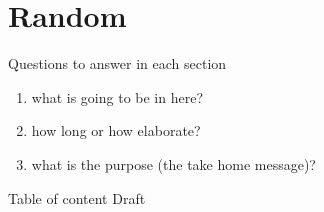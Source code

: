 \chapter{Random}

\graphicspath{{./Figures/Modeling}}

Questions to answer in each section 


\begin{enumerate}
	\item what is going to be in here?
	\item how long or how elaborate?
	\item what is the purpose (the take home message)? 
\end{enumerate}





Table of content Draft
